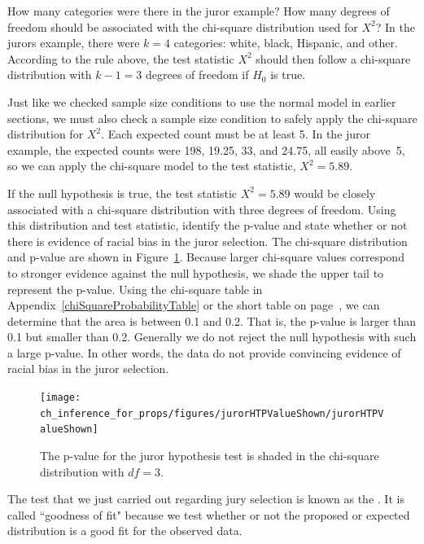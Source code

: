 \begin{example}{How many categories were there in the juror example? How many degrees of freedom should be associated with the chi-square distribution used for $X^2$?}
In the jurors example, there were $k=4$ categories: white, black, Hispanic, and other. According to the rule above, the test statistic $X^2$ should then follow a chi-square distribution with $k-1 = 3$ degrees of freedom if $H_0$ is true.
\end{example}

Just like we checked sample size conditions to use the normal model in earlier sections, we must also check a sample size condition to safely apply the chi-square distribution for $X^2$. Each expected count must be at least 5. In the juror example, the expected counts were 198, 19.25, 33, and 24.75, all easily above~5, so we can apply the chi-square model to the test statistic, $X^2=5.89$.

\begin{example}{If the null hypothesis is true, the test statistic $X^2=5.89$ would be closely associated with a chi-square distribution with three degrees of freedom. Using this distribution and test statistic, identify the p-value and state whether or not there is evidence of racial bias in the juror selection.}
The chi-square distribution and p-value are shown in Figure~\ref{jurorHTPValueShown}. Because larger chi-square values correspond to stronger evidence against the null hypothesis, we shade the upper tail to represent the p-value. Using the chi-square table in Appendix~\ref{chiSquareProbabilityTable} or the short table on page~\pageref{chiSquareProbabilityTableShort}, we can determine that the area is between 0.1 and 0.2. That is, the p-value is larger than 0.1 but smaller than 0.2. Generally we do not reject the null hypothesis with such a large p-value. In other words, the data do not provide convincing evidence of racial bias in the juror selection.
\end{example}

\begin{figure}[h]
\centering
\texttt{[image: ch\_inference\_for\_props/figures/jurorHTPValueShown/jurorHTPValueShown]}
\caption{The p-value for the juror hypothesis test is shaded in the chi-square distribution with $df=3$.}
\label{jurorHTPValueShown}
\end{figure}

The test that we just carried out regarding jury selection is known as the . It is called ``goodness of fit" because we test whether or not the proposed or expected distribution is a good fit for the observed data.

